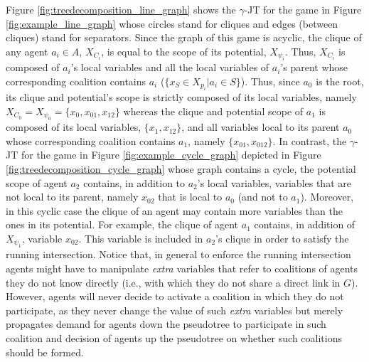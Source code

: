 \documentclass{aamas2012}
\begin{document}
Figure \ref{fig:treedecomposition_line_graph} shows the $\gamma$-JT
for the game in Figure \ref{fig:example_line_graph} whose circles stand for
cliques and edges (between cliques) stand for separators. Since the graph of
this game is acyclic, the clique of any agent $a_i\in A$, $X_{C_i}$, is
equal to the scope of its potential, $X_{\psi_i}$. Thus, $X_{C_i}$ is composed
of $a_i$'s local variables and all the local variables of $a_i$'s parent whose
corresponding coalition contains $a_i$ ($\{x_S\in X_{p_i} \vert a_i\in S\}$).
Thus, since $a_0$ is the root, its clique and potential's scope is strictly
composed of its local variables, namely
$X_{C_0}=X_{\psi_0}=\{x_0,x_{01},x_{12}\}$ whereas the clique and potential
scope of $a_1$ is composed of its local variables, $\{x_1,x_{12}\}$, and all
variables local to its parent $a_0$ whose corresponding coalition contains
$a_1$, namely $\{x_{01},x_{012}\}$. In contrast, the $\gamma$-JT for
the game in Figure \ref{fig:example_cycle_graph} depicted in Figure
\ref{fig:treedecomposition_cycle_graph} whose graph contains a cycle, the
potential scope of agent $a_2$ contains, in addition to $a_2$'s local
variables, variables that are not local to its parent, namely $x_{02}$ that is
local to $a_0$ (and not to $a_1$). Moreover, in this cyclic case the clique of
an agent may contain more variables than the ones in its potential. For
example, the clique of agent $a_1$ contains, in addition of 
$X_{\psi_1}$, variable $x_{02}$. This variable is included in $a_2$'s clique in
order to satisfy the running intersection. Notice
that, in general to enforce the running intersection agents might have
to manipulate \emph{extra} variables that refer to coalitions of agents they do
not know directly (i.e., with which they do not share a direct link in $G$).
However, agents will never decide to activate a coalition in which they do not
participate, as they never change the value of such \emph{extra} variables but
merely propagates demand for agents down the pseudotree to participate in such
coalition and decision of agents up the pseudotree on whether such coalitions
should be formed.
\end{document}
